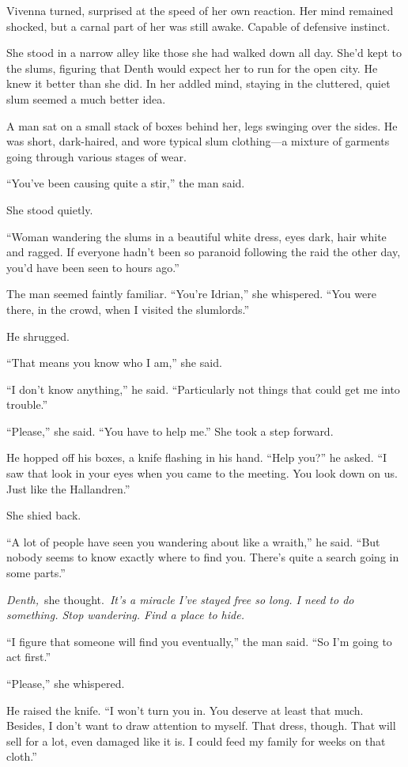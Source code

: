 Vivenna turned, surprised at the speed of her own reaction. Her mind remained shocked, but a carnal part of her was still awake. Capable of defensive instinct.

She stood in a narrow alley like those she had walked down all day. She’d kept to the slums, figuring that Denth would expect her to run for the open city. He knew it better than she did. In her addled mind, staying in the cluttered, quiet slum seemed a much better idea.

A man sat on a small stack of boxes behind her, legs swinging over the sides. He was short, dark-haired, and wore typical slum clothing—a mixture of garments going through various stages of wear.

“You’ve been causing quite a stir,” the man said.

She stood quietly.

“Woman wandering the slums in a beautiful white dress, eyes dark, hair white and ragged. If everyone hadn’t been so paranoid following the raid the other day, you’d have been seen to hours ago.”

The man seemed faintly familiar. “You’re Idrian,” she whispered. “You were there, in the crowd, when I visited the slumlords.”

He shrugged.

“That means you know who I am,” she said.

“I don’t know anything,” he said. “Particularly not things that could get me into trouble.”

“Please,” she said. “You have to help me.” She took a step forward.

He hopped off his boxes, a knife flashing in his hand. “Help you?” he asked. “I saw that look in your eyes when you came to the meeting. You look down on us. Just like the Hallandren.”

She shied back.

“A lot of people have seen you wandering about like a wraith,” he said. “But nobody seems to know exactly where to find you. There’s quite a search going in some parts.”

\textit{Denth,}~she thought.~\textit{It’s a miracle I’ve stayed free so long. I need to do something. Stop wandering. Find a place to hide.}

“I figure that someone will find you eventually,” the man said. “So I’m going to act first.”

“Please,” she whispered.

He raised the knife. “I won’t turn you in. You deserve at least that much. Besides, I don’t want to draw attention to myself. That dress, though. That will sell for a lot, even damaged like it is. I could feed my family for weeks on that cloth.”

